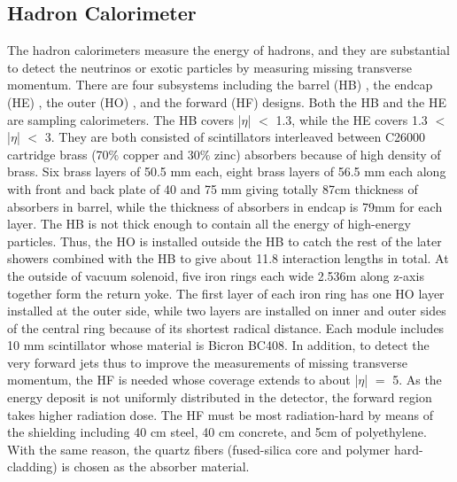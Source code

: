 \subsection{Hadron Calorimeter} 
The hadron calorimeters measure the energy of hadrons, and they are substantial to detect the neutrinos or exotic particles by measuring missing transverse momentum.
There are four subsystems including the barrel (HB) , the endcap (HE) , the outer (HO) , and the forward (HF) designs.
Both the HB and the HE are sampling calorimeters. 
The HB covers |$\eta $| $<$ 1.3, while the HE covers 1.3 $<$ |$\eta $| $<$ 3.
They are both consisted of scintillators interleaved between C26000 cartridge brass (70$\% $ copper and 30$\% $ zinc) absorbers because of high density of brass.
Six brass layers of 50.5 mm each, eight brass layers of 56.5 mm each along with front and back plate of 40 and 75 mm giving totally 87cm thickness of absorbers in barrel, while the thickness of absorbers in endcap is 79mm for each layer.
The HB is not thick enough to contain all the energy of high-energy particles.
Thus, the HO is installed outside the HB to catch the rest of the later showers combined with the HB to give about 11.8 interaction lengths in total. At the outside of vacuum solenoid, five iron rings each wide 2.536m along z-axis together form the return yoke. The first layer of each iron ring has one HO layer installed at the outer side, while two layers are installed on inner and outer sides of the central ring because of its shortest radical distance. Each module includes 10 mm scintillator whose material is Bicron BC408.
In addition, to detect the very forward jets thus to improve the measurements of missing transverse momentum, the HF is needed whose coverage extends to about |$\eta $| $=$ 5.
As the energy deposit is not uniformly distributed in the detector, the forward region takes higher radiation dose.
The HF must be most radiation-hard by means of the shielding including 40 cm steel, 40 cm concrete, and 5cm of polyethylene. With the same reason, the quartz fibers (fused-silica core and polymer hard-cladding) is chosen as the absorber material.




